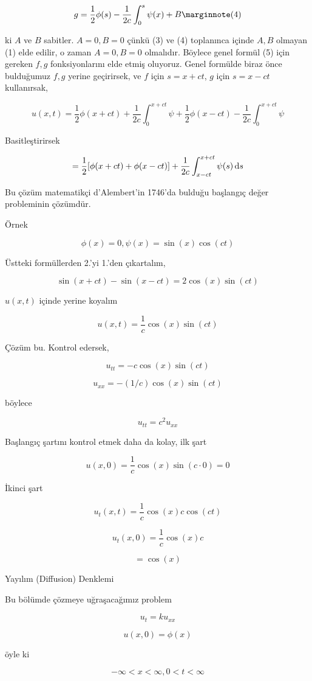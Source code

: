\documentclass[12pt,fleqn]{article}\usepackage{../../common}
\begin{document}
$$ g = \frac{1}{2}\phi(s) - \frac{1}{2c} \int_0^s \psi(x) + B
\mlabel{4}
$$


ki $A$ ve $B$ sabitler. $A=0,B=0$ çünkü (3) ve (4) toplanınca içinde $A,B$
olmayan (1) elde edilir, o zaman $A=0,B=0$ olmalıdır. Böylece genel formül
(5) için gereken $f,g$ fonksiyonlarını elde etmiş oluyoruz. Genel formülde
biraz önce bulduğumuz $f,g$ yerine geçirirsek, ve $f$ için $s = x+ct$, $g$
için $s = x-ct$ kullanırsak,

$$ u(x,t) = 
\frac{1}{2}\phi(x+ct) + 
\frac{1}{2c} \int_0 ^{x+ct} \psi + 
\frac{1}{2}\phi(x-ct) -
\frac{1}{2c} \int_0 ^{x+ct} \psi 
 $$

Basitleştirirsek 

$$ = \frac{1}{2}[\phi(x+ct) + \phi(x-ct)] + 
\frac{1}{2c} \int_{x-ct} ^{x+ct} \psi (s) \,\mathrm{d} s
 $$

Bu çözüm matematikçi d'Alembert'in 1746'da bulduğu başlangıç değer
probleminin çözümdür. 

Örnek

$$ \phi(x) = 0, \psi(x) = \sin(x)\cos(ct) $$

Üstteki formüllerden 2.'yi 1.'den çıkartalım, 

$$ \sin(x+ct) - \sin(x-ct) = 2\cos(x)\sin(ct) $$

$u(x,t)$ içinde yerine koyalım

$$ u(x,t) = \frac{1}{c}\cos(x)\sin(ct) $$

Çözüm bu. Kontrol edersek, 

$$ u_{tt} = -c \cos(x)\sin(ct) $$

$$ u_{xx} = -(1/c)\cos(x)\sin(ct) $$

böylece 

$$ u_{tt} = c^2 u_{xx} $$

Başlangıç şartını kontrol etmek daha da kolay, ilk şart

$$ u(x,0) = \frac{1}{c}\cos(x)\sin(c \cdot 0)  = 0$$

İkinci şart

$$ u_t(x,t) = \frac{1}{c}\cos(x) c \cos(ct) $$

$$ u_t(x,0) = \frac{1}{c}\cos(x) c $$

$$  = \cos(x) $$

Yayılım (Diffusion) Denklemi

Bu bölümde çözmeye uğraşacağımız problem

$$  u_t = k u_{xx}  $$

$$ u(x,0) = \phi(x) $$

öyle ki 

$$ -\infty < x < \infty, 0 < t < \infty $$
\end{document}
